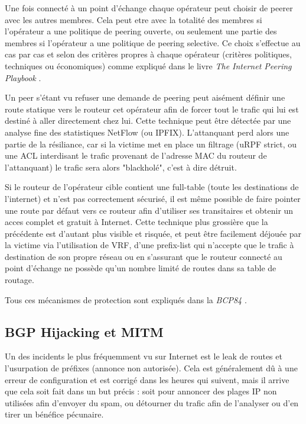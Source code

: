 Une fois connecté à un point d'échange chaque opérateur peut choisir de peerer avec les autres membres. Cela peut etre avec la totalité des membres si l'opérateur a une politique de peering ouverte, ou seulement une partie des membres si l'opérateur a une politique de peering selective. Ce choix s'effectue au cas par cas et selon des critères propres à chaque opérateur (critères politiques, techniques ou économiques) comme expliqué dans le livre \emph{The Internet Peering Playbook} \cite{fenioux:PeeringPlaybook}.

Un peer s'étant vu refuser une demande de peering peut aisément définir une route statique vers le routeur cet opérateur afin de forcer tout le trafic qui lui est destiné à aller directement chez lui. Cette technique peut être détectée par une analyse fine des statistiques NetFlow (ou IPFIX). L'attanquant perd alors une partie de la résiliance, car si la victime met en place un filtrage (uRPF strict, ou une ACL interdisant le trafic provenant de l'adresse MAC du routeur de l'attanquant) le trafic sera alors "blackholé", c'est à dire détruit.

Si le routeur de l'opérateur cible contient une full-table (toute les destinations de l'internet) et n'est pas correctement sécurisé, il est même possible de faire pointer une route par défaut vers ce routeur afin d’utiliser ses transitaires et obtenir un acces complet et gratuit à Internet. Cette technique plus grossière que la précédente est d'autant plus visible et risquée, et peut être facilement déjouée par la victime via l'utilisation de VRF, d'une prefix-list qui n'accepte que le trafic à destination de son propre réseau ou en s'assurant que le routeur connecté au point d'échange ne possède qu'un nombre limité de routes dans sa table de routage.

Tous ces mécanismes de protection sont expliqués dans la \emph{BCP84} \cite{fenioux:BCP84}.


\subsection{BGP Hijacking et MITM}

Un des incidents le plus fréquemment vu sur Internet est le leak de routes et l'usurpation de préfixes (annonce non autorisée). Cela est généralement dû à une erreur de configuration et est corrigé dans les heures qui suivent, mais il arrive que cela soit fait dans un but précis : soit pour annoncer des plages IP non utilisées afin d'envoyer du spam, ou détourner du trafic afin de l'analyser ou d'en tirer un bénéfice pécunaire.

